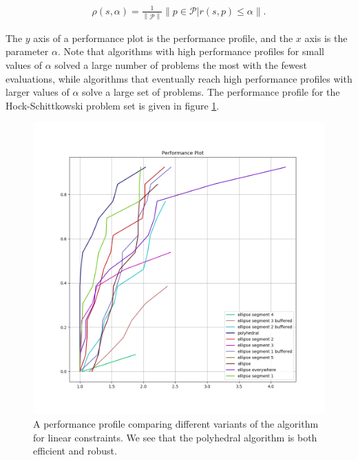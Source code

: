 \documentclass{article}
\begin{document}
\begin{align}
\rho(s, \alpha) = \frac 1 {\left\|\mathcal P \right\|} \left\|p \in \mathcal P | r(s, p) \le \alpha\right\|.
\end{align}

The $y$ axis of a performance plot is the performance profile, and the $x$ axis is the parameter $\alpha$.
Note that algorithms with high performance profiles for small values of $\alpha$ solved a large number of problems the most with the fewest evaluations, while algorithms that eventually reach high performance profiles with larger values of $\alpha$ solve a large set of problems.
The performance profile for the Hock-Schittkowski problem set is given in figure \cref{performance_profile_image}.

	
\begin{figure}[ht]
    \centering
    \includegraphics[scale=0.4]{images/performance_profile_plot.png}
    \caption[A performance profile comparing variants of the algorithm for linear constraints.]{
    	A performance profile comparing different variants of the algorithm for linear constraints.
    	We see that the polyhedral algorithm is both efficient and robust.
    }
    \label{performance_profile_image}
\end{figure}
\end{document}
